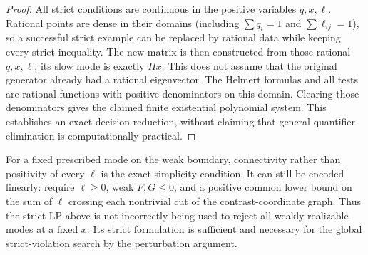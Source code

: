 \documentclass[11pt]{article}
\begin{document}
\begin{proof}
All strict conditions are continuous in the positive variables
$q,x,\ell$. Rational points are dense in their domains (including
$\sum q_i=1$ and $\sum\ell_{ij}=1$), so a successful strict example
can be replaced by rational data while keeping every strict inequality.
The new matrix is then constructed from those rational $q,x,\ell$; its
slow mode is exactly $Hx$. This does not assume that the original
generator already had a rational eigenvector.
The Helmert formulas and all tests are rational functions with positive
denominators on this domain. Clearing those denominators gives the
claimed finite existential polynomial system. This establishes an
exact decision reduction, without claiming that general quantifier
elimination is computationally practical.
\end{proof}

For a fixed prescribed mode on the weak boundary, connectivity rather
than positivity of every $\ell$ is the exact simplicity condition.
It can still be encoded linearly: require $\ell\geq0$, weak $F,G\leq0$,
and a positive common lower bound on the sum of $\ell$ crossing each
nontrivial cut of the contrast-coordinate graph. Thus the strict LP
above is not incorrectly being used to reject all weakly realizable
modes at a fixed $x$. Its strict formulation is sufficient and necessary
for the global strict-violation search by the perturbation argument.
\end{document}
